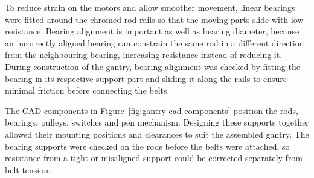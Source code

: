 To reduce strain on the motors and allow smoother movement, linear bearings were fitted around the chromed rod rails so that the moving parts slide with low resistance. Bearing alignment is important as well as bearing diameter, because an incorrectly aligned bearing can constrain the same rod in a different direction from the neighbouring bearing, increasing resistance instead of reducing it. During construction of the gantry, bearing alignment was checked by fitting the bearing in its respective support part and sliding it along the rails to ensure minimal friction before connecting the belts.

The CAD components in Figure~\ref{fig:gantry-cad-components} position the rods, bearings, pulleys, switches and pen mechanism. Designing these supports together allowed their mounting positions and clearances to suit the assembled gantry. The bearing supports were checked on the rods before the belts were attached, so resistance from a tight or misaligned support could be corrected separately from belt tension.

